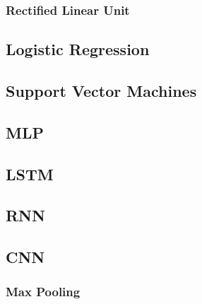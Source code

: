 \subsubsection{Rectified Linear Unit}

\subsection{Logistic Regression}

\subsection{Support Vector Machines}

\subsection{MLP}

\subsection{LSTM}

\subsection{RNN}

\subsection{CNN}

\subsubsection{Max Pooling}

